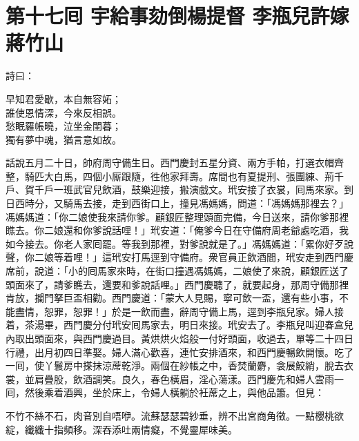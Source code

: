 
\chapter*{第十七囘 宇給事劾倒楊提督 李瓶兒許嫁蔣竹山}


詩曰：

\begin{myquote}
早知君愛歇，本自無容妬；\\誰使恩情深，今來反相誤。\\愁眠羅帳曉，泣坐金閨暮；\\獨有夢中魂，猶言意如故。
\end{myquote}

話說五月二十日，帥府周守備生日。西門慶封五星分資、兩方手帕，打選衣帽齊整，騎匹大白馬，四個小厮跟隨，徃他家拜壽。席間也有夏提刑、張團練、荊千戶、賀千戶一班武官兒飲酒，鼓樂迎接，搬演戲文。玳安接了衣裳，囘馬來家。到日西時分，又騎馬去接，走到西街口上，撞見馮媽媽，問道：「馮媽媽那裡去？」馮媽媽道：「你二娘使我來請你爹。顧銀匠整理頭面完備，今日送來，請你爹那裡瞧去。你二娘還和你爹說話哩！」玳安道：「俺爹今日在守備府周老爺處吃酒，我如今接去。你老人家囘罷。等我到那裡，對爹說就是了。」馮媽媽道：「累你好歹說聲，你二娘等着哩！」這玳安打馬逕到守備府。衆官員正飲酒間，玳安走到西門慶席前，說道：「小的囘馬家來時，在街口撞遇馮媽媽，二娘使了來說，顧銀匠送了頭面來了，請爹瞧去，還要和爹說話哩。」西門慶聽了，就要起身，那周守備那裡肯放，攔門拏巨盃相勸。西門慶道：「蒙大人見賜，寧可飲一盃，還有些小事，不能盡情，恕罪，恕罪！」於是一飲而盡，辭周守備上馬，逕到李瓶兒家。婦人接着，茶湯畢，西門慶分付玳安囘馬家去，明日來接。玳安去了。李瓶兒叫迎春盒兒內取出頭面來，與西門慶過目。黃烘烘火焰般一付好頭面，收過去，單等二十四日行禮，出月初四日準娶。婦人滿心歡喜，連忙安排酒來，和西門慶暢飲開懷。吃了一囘，使丫鬟房中搽抹涼蓆乾淨。兩個在紗帳之中，香焚蘭麝，衾展鮫綃，脫去衣裳，並肩疊股，飲酒調笑。良久，春色橫眉，淫心蕩漾。西門慶先和婦人雲雨一囘，然後乘着酒興，坐於床上，令婦人橫躺於衽蓆之上，與他品簫。但見：

\begin{myquote}
不竹不絲不石，肉音別自唔咿。流蘇瑟瑟碧紗垂，辨不出宮商角徵。一點櫻桃欲綻，纖纖十指頻移。深吞添吐兩情癡，不覺靈犀味美。
\end{myquote}

